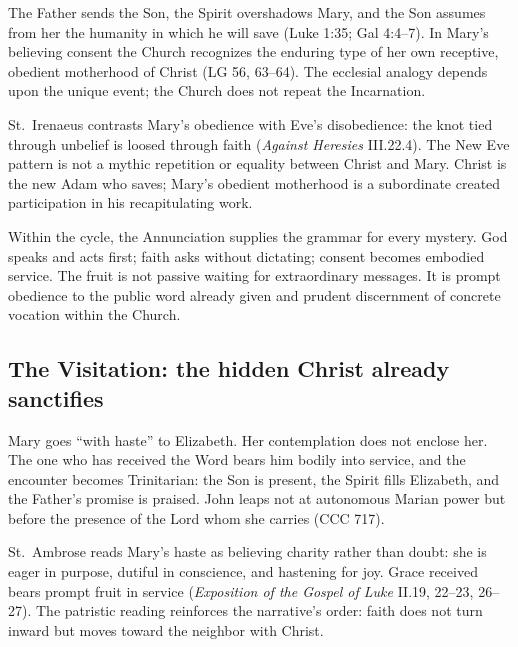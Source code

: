 The Father sends the Son, the Spirit overshadows Mary, and the Son assumes from her the humanity in which he will save (Luke 1:35; Gal 4:4--7). In Mary's believing consent the Church recognizes the enduring type of her own receptive, obedient motherhood of Christ (LG 56, 63--64). The ecclesial analogy depends upon the unique event; the Church does not repeat the Incarnation.

St.~Irenaeus contrasts Mary's obedience with Eve's disobedience: the knot tied through unbelief is loosed through faith (\emph{Against Heresies} III.22.4). The New Eve pattern is not a mythic repetition or equality between Christ and Mary. Christ is the new Adam who saves; Mary's obedient motherhood is a subordinate created participation in his recapitulating work.

Within the cycle, the Annunciation supplies the grammar for every mystery. God speaks and acts first; faith asks without dictating; consent becomes embodied service. The fruit is not passive waiting for extraordinary messages. It is prompt obedience to the public word already given and prudent discernment of concrete vocation within the Church.

\subsection{The Visitation: the hidden Christ already sanctifies}


Mary goes ``with haste'' to Elizabeth. Her contemplation does not enclose her. The one who has received the Word bears him bodily into service, and the encounter becomes Trinitarian: the Son is present, the Spirit fills Elizabeth, and the Father's promise is praised. John leaps not at autonomous Marian power but before the presence of the Lord whom she carries (CCC 717).

St.~Ambrose reads Mary's haste as believing charity rather than doubt: she is eager in purpose, dutiful in conscience, and hastening for joy. Grace received bears prompt fruit in service (\emph{Exposition of the Gospel of Luke} II.19, 22--23, 26--27). The patristic reading reinforces the narrative's order: faith does not turn inward but moves toward the neighbor with Christ.

